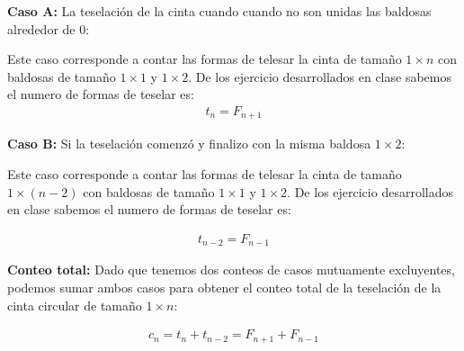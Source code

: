 \begin{solution}
\textbf{Caso A:} La teselación de la cinta cuando cuando no son unidas las baldosas alrededor de 0:

\begin{center}
    \shorthandoff{>}
  \shorthandon{>}
\end{center}
Este caso corresponde a contar las formas de telesar la cinta de tamaño \(1 \times n\) con baldosas de tamaño \(1 \times 1\) y \(1 \times 2\). De los ejercicio desarrollados en clase sabemos el numero de formas de teselar es:
\begin{align*}
    t_n = F_{n+1} 
\end{align*}


\textbf{Caso B:} Si la teselación comenzó y finalizo con la misma baldosa $1 \times 2$:
\begin{center}
    \shorthandoff{>}
  \shorthandon{>}
\end{center}

Este caso corresponde a contar las formas de telesar la cinta de tamaño \(1 \times (n-2)\) con baldosas de tamaño \(1 \times 1\) y \(1 \times 2\). De los ejercicio desarrollados en clase sabemos el numero de formas de teselar es:

\begin{align*}
    t_{n-2} = F_{n-1}
\end{align*}

\textbf{Conteo total:} Dado que tenemos dos conteos de casos mutuamente excluyentes, podemos sumar ambos casos para obtener el conteo total de la teselación de la cinta circular de tamaño \(1 \times n\):

\begin{align*}
    c_n = t_n + t_{n-2} = F_{n+1} + F_{n-1}
\end{align*}

\end{solution}